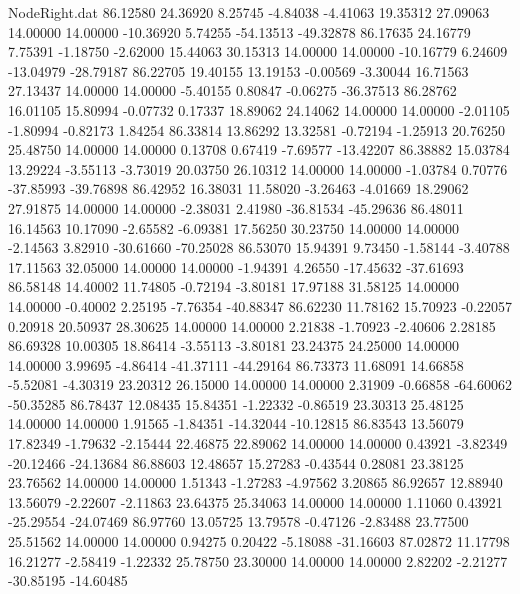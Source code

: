 \begin{filecontents}{NodeRight.dat}
  86.12580   24.36920    8.25745    -4.84038   -4.41063   19.35312   27.09063   14.00000   14.00000  -10.36920    5.74255  -54.13513  -49.32878
  86.17635   24.16779    7.75391    -1.18750   -2.62000   15.44063   30.15313   14.00000   14.00000  -10.16779    6.24609  -13.04979  -28.79187
  86.22705   19.40155   13.19153    -0.00569   -3.30044   16.71563   27.13437   14.00000   14.00000   -5.40155    0.80847   -0.06275  -36.37513
  86.28762   16.01105   15.80994    -0.07732    0.17337   18.89062   24.14062   14.00000   14.00000   -2.01105   -1.80994   -0.82173    1.84254
  86.33814   13.86292   13.32581    -0.72194   -1.25913   20.76250   25.48750   14.00000   14.00000    0.13708    0.67419   -7.69577  -13.42207
  86.38882   15.03784   13.29224    -3.55113   -3.73019   20.03750   26.10312   14.00000   14.00000   -1.03784    0.70776  -37.85993  -39.76898
  86.42952   16.38031   11.58020    -3.26463   -4.01669   18.29062   27.91875   14.00000   14.00000   -2.38031    2.41980  -36.81534  -45.29636
  86.48011   16.14563   10.17090    -2.65582   -6.09381   17.56250   30.23750   14.00000   14.00000   -2.14563    3.82910  -30.61660  -70.25028
  86.53070   15.94391    9.73450    -1.58144   -3.40788   17.11563   32.05000   14.00000   14.00000   -1.94391    4.26550  -17.45632  -37.61693
  86.58148   14.40002   11.74805    -0.72194   -3.80181   17.97188   31.58125   14.00000   14.00000   -0.40002    2.25195   -7.76354  -40.88347
  86.62230   11.78162   15.70923    -0.22057    0.20918   20.50937   28.30625   14.00000   14.00000    2.21838   -1.70923   -2.40606    2.28185
  86.69328   10.00305   18.86414    -3.55113   -3.80181   23.24375   24.25000   14.00000   14.00000    3.99695   -4.86414  -41.37111  -44.29164
  86.73373   11.68091   14.66858    -5.52081   -4.30319   23.20312   26.15000   14.00000   14.00000    2.31909   -0.66858  -64.60062  -50.35285
  86.78437   12.08435   15.84351    -1.22332   -0.86519   23.30313   25.48125   14.00000   14.00000    1.91565   -1.84351  -14.32044  -10.12815
  86.83543   13.56079   17.82349    -1.79632   -2.15444   22.46875   22.89062   14.00000   14.00000    0.43921   -3.82349  -20.12466  -24.13684
  86.88603   12.48657   15.27283    -0.43544    0.28081   23.38125   23.76562   14.00000   14.00000    1.51343   -1.27283   -4.97562    3.20865
  86.92657   12.88940   13.56079    -2.22607   -2.11863   23.64375   25.34063   14.00000   14.00000    1.11060    0.43921  -25.29554  -24.07469
  86.97760   13.05725   13.79578    -0.47126   -2.83488   23.77500   25.51562   14.00000   14.00000    0.94275    0.20422   -5.18088  -31.16603
  87.02872   11.17798   16.21277    -2.58419   -1.22332   25.78750   23.30000   14.00000   14.00000    2.82202   -2.21277  -30.85195  -14.60485

\end{filecontents}
